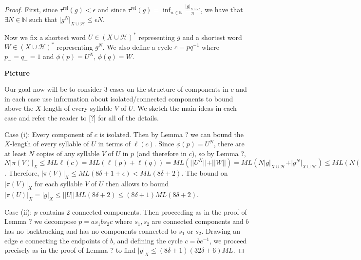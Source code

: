 \documentclass[12pt]{article}
\newcommand{\vs}{\vskip10pt}
\begin{document}
	\begin{proof}
		
		First, since $\tau^{\text{rel}}(g) < \epsilon$ and since $\tau^{\text{rel}}(g) = \inf_{n \in \mathbb{N}} \frac{\vert g \vert_{X \cup H}}{n}$, we have that $\exists N \in \mathbb{N}$ such that $\vert g^N \vert_{X \cup \mathcal{H}} \leq \epsilon N$. 
		
		\vs 
		
		Now we fix a shortest word $U \in (X \cup \mathcal{H})^*$ representing $g$ and a shortest word $W \in (X \cup \mathcal{H})^*$ representing $g^N$. We also define a cycle $c = pq^{-1}$ where $p_- = q_- = 1$ and $\phi(p) = U^N$, $\phi(q) = W$. 
		
		\textbf{Picture}
		
		\vs
		
		Our goal now will be to consider 3 cases on the structure of components in $c$ and in each case use information about isolated/connected components to bound above the $X$-length of every syllable $V$ of $U$. We sketch the main ideas in each case and refer the reader to [?] for all of the details. 
		
		\vs 
		
		Case (i): Every component of $c$ is isolated. Then by Lemma ? we can bound the $X$-length of every syllable of $U$ in terms of $\ell(c)$. Since $\phi(p) = U^N$, there are at least $N$ copies of any syllable $V$ of $U$ in $p$ (and therefore in $c$), so by Lemma ?, $N \vert \pi(V) \vert_X \leq ML \ell(c)  = ML( \ell(p) + \ell(q) )= ML (\vert \vert U^N \vert \vert + \vert \vert W \vert \vert) = ML(N \vert g \vert_{X \cup \mathcal{H}} + \vert g^N \vert_{X \cup \mathcal{H}}) \leq ML( N(8 \delta + 1) + \epsilon N)$. Therefore, $\vert \pi(V) \vert_X \leq ML(8 \delta + 1 + \epsilon) < ML(8 \delta + 2)$. The bound on $\vert \pi(V) \vert_X$ for each syllable $V$ of $U$ then allows to bound $\vert \pi(U) \vert_X = \vert g \vert_X \leq \vert \vert U \vert \vert ML(8 \delta + 2) \leq (8 \delta + 1)ML(8 \delta + 2)$. 
		
		\vs 
		
		Case (ii): $p$ contains 2 connected components. Then proceeding as in the proof of Lemma ? we decompose $p = a s_1 b s_2 c$ where $s_1, s_2$ are connected components and $b$ has no backtracking and has no components connected to $s_1$ or $s_2$. Drawing an edge $e$ connecting the endpoints of $b$, and defining the cycle $c = b e^{-1}$, we proceed precisely as in the proof of Lemma ? to find $\vert g \vert_X \leq (8 \delta + 1)(32 \delta + 6)ML$. 
		

\end{proof}
\end{document}
